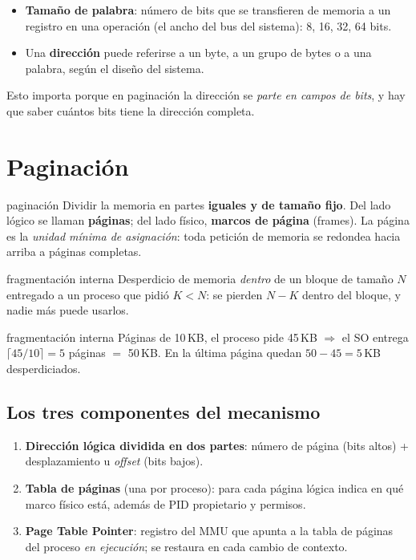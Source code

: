 \documentclass[11pt,letterpaper]{article}
\begin{document}
\begin{itemize}[nosep]
  \item \textbf{Tama\~no de palabra}: n\'umero de bits que se transfieren de memoria a un registro en una operaci\'on (el ancho del bus del sistema): 8, 16, 32, 64 bits.
  \item Una \textbf{direcci\'on} puede referirse a un byte, a un grupo de bytes o a una palabra, seg\'un el dise\~no del sistema.
\end{itemize}

Esto importa porque en paginaci\'on la direcci\'on se \emph{parte en campos de bits}, y hay que saber cu\'antos bits tiene la direcci\'on completa.

\section{Paginaci\'on}

\begin{defin}{paginaci\'on}
Dividir la memoria en partes \textbf{iguales y de tama\~no fijo}. Del lado l\'ogico se llaman \textbf{p\'aginas}; del lado f\'isico, \textbf{marcos de p\'agina} (frames). La p\'agina es la \emph{unidad m\'inima de asignaci\'on}: toda petici\'on de memoria se redondea hacia arriba a p\'aginas completas.
\end{defin}

\begin{defin}{fragmentaci\'on interna}
Desperdicio de memoria \emph{dentro} de un bloque de tama\~no $N$ entregado a un proceso que pidi\'o $K < N$: se pierden $N-K$ dentro del bloque, y nadie m\'as puede usarlos.
\end{defin}

\begin{ejemplo}{fragmentaci\'on interna}
P\'aginas de 10\,KB, el proceso pide 45\,KB $\Rightarrow$ el SO entrega $\lceil 45/10 \rceil = 5$ p\'aginas $=$ 50\,KB. En la \'ultima p\'agina quedan $50-45 = 5$\,KB desperdiciados.
\end{ejemplo}

\subsection{Los tres componentes del mecanismo}

\begin{enumerate}[nosep]
  \item \textbf{Direcci\'on l\'ogica dividida en dos partes}: n\'umero de p\'agina (bits altos) + desplazamiento u \emph{offset} (bits bajos).
  \item \textbf{Tabla de p\'aginas} (una por proceso): para cada p\'agina l\'ogica indica en qu\'e marco f\'isico est\'a, adem\'as de PID propietario y permisos.
  \item \textbf{Page Table Pointer}: registro del MMU que apunta a la tabla de p\'aginas del proceso \emph{en ejecuci\'on}; se restaura en cada cambio de contexto.
\end{enumerate}
\end{document}
